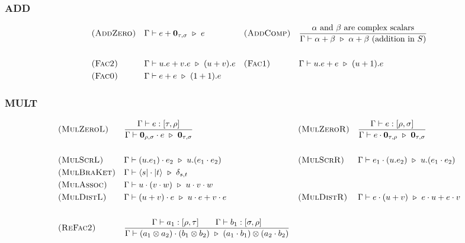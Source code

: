 \subsubsection*{\textsf{ADD}}
\begin{align*}
  & \textsc{(AddZero)} && \Gamma \vdash e + \textbf{0}_{\tau, \sigma} \ \triangleright\  e 
  && \textsc{(AddComp)} && \frac{\textrm{$\alpha$ and $\beta$ are complex scalars}}{\Gamma \vdash \alpha + \beta \ \triangleright\  \alpha + \beta\ \textrm{(addition in $S$)}} \\
  \\
  & \textsc{(Fac2)} && 
    \Gamma \vdash u.e + v.e \ \triangleright\  (u + v).e
  && \textsc{(Fac1)} &&
    \Gamma \vdash u.e + e \ \triangleright\  (u + 1).e \\
  & \textsc{(Fac0)} &&
    \Gamma \vdash e + e \ \triangleright\  (1 + 1).e
\end{align*}

\subsubsection*{\textsf{MULT}}
\begin{align*}
  & \textsc{(MulZeroL)}
  && \frac{\Gamma \vdash e : [\tau, \rho]}{\Gamma \vdash \textbf{0}_{\rho, \sigma} \cdot e \ \triangleright\  \textbf{0}_{\tau, \sigma}}
  && \textsc{(MulZeroR)}
  && \frac{\Gamma \vdash e : [\rho, \sigma]}{\Gamma \vdash e \cdot \textbf{0}_{\tau, \rho} \ \triangleright\  \textbf{0}_{\tau, \sigma}} \\
  \\
  & \textsc{(MulScrL)} && \Gamma \vdash (u.e_1) \cdot e_2 \ \triangleright\  u.(e_1 \cdot e_2)
  && \textsc{(MulScrR)} && \Gamma \vdash e_1 \cdot (u.e_2) \ \triangleright\  u.(e_1 \cdot e_2)
  \\
  & \textsc{(MulBraKet)} && \Gamma \vdash \langle s| \cdot |t\rangle \ \triangleright\  \delta_{s, t} \\ 
  & \textsc{(MulAssoc)} && 
  \Gamma \vdash u \cdot (v \cdot w) \ \triangleright\  u \cdot v \cdot w \\
  & \textsc{(MulDistL)} && \Gamma \vdash (u + v) \cdot e \ \triangleright\  u \cdot e + v \cdot e
  && \textsc{(MulDistR)} && \Gamma \vdash e \cdot (u + v) \ \triangleright\  e \cdot u + e \cdot v \\
  \\
  & \textsc{(ReFac2)} && \frac{\Gamma \vdash a_1 : [\rho, \tau] \qquad \Gamma \vdash b_1 : [\sigma, \rho]}{\Gamma \vdash (a_1 \otimes a_2) \cdot (b_1 \otimes b_2) \ \triangleright\  (a_1 \cdot b_1) \otimes (a_2 \cdot b_2)} \\
\end{align*}

